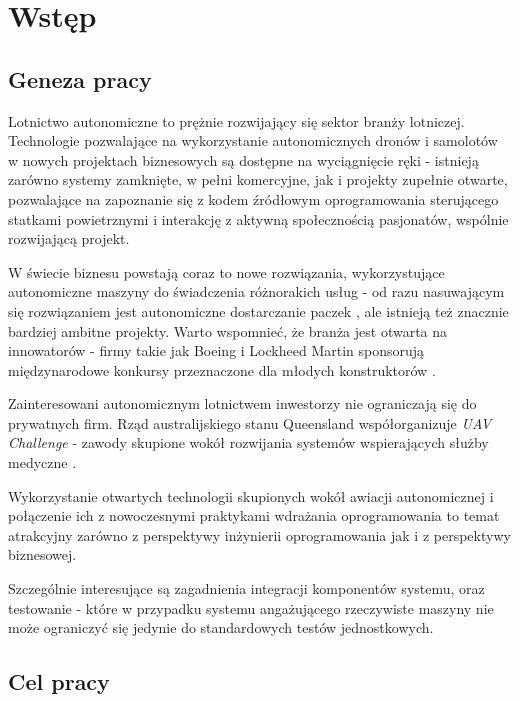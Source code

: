 \chapter{Wstęp}


\section{Geneza pracy}

Lotnictwo autonomiczne to prężnie rozwijający się sektor branży lotniczej.
Technologie pozwalające na wykorzystanie autonomicznych dronów i samolotów
w nowych projektach biznesowych są dostępne na wyciągnięcie ręki - istnieją
zarówno systemy zamknięte, w pełni komercyjne, jak i projekty zupełnie otwarte,
pozwalające na zapoznanie się z kodem źródłowym oprogramowania sterującego statkami
powietrznymi i interakcję z aktywną społecznością pasjonatów, wspólnie rozwijającą
projekt. 

W świecie biznesu powstają coraz to nowe rozwiązania, wykorzystujące autonomiczne
maszyny do świadczenia różnorakich usług - od razu nasuwającym się rozwiązaniem
jest autonomiczne dostarczanie paczek \cite{prime_air}, ale istnieją też znacznie
bardziej ambitne projekty\cite{10.1001/jama.2017.3957}. Warto wspomnieć, że branża
jest otwarta na innowatorów - firmy takie jak Boeing i Lockheed Martin sponsorują
międzynarodowe konkursy przeznaczone dla młodych konstruktorów \cite{sae_2018}. 

Zainteresowani autonomicznym lotnictwem inwestorzy nie ograniczają się do
prywatnych firm. Rząd australijskiego stanu Queensland współorganizuje
\textit{UAV Challenge} - zawody skupione wokół rozwijania systemów wspierających 
służby medyczne \cite{uav_sponsors}.


Wykorzystanie otwartych technologii skupionych wokół awiacji autonomicznej
i połączenie ich z nowoczesnymi praktykami wdrażania oprogramowania to temat
atrakcyjny zarówno z perspektywy inżynierii oprogramowania jak i z perspektywy biznesowej. 

Szczególnie interesujące są zagadnienia integracji komponentów systemu,
oraz testowanie - które w przypadku systemu angażującego rzeczywiste
maszyny nie może ograniczyć się jedynie do standardowych testów jednostkowych.

\newpage
\section{Cel pracy}

